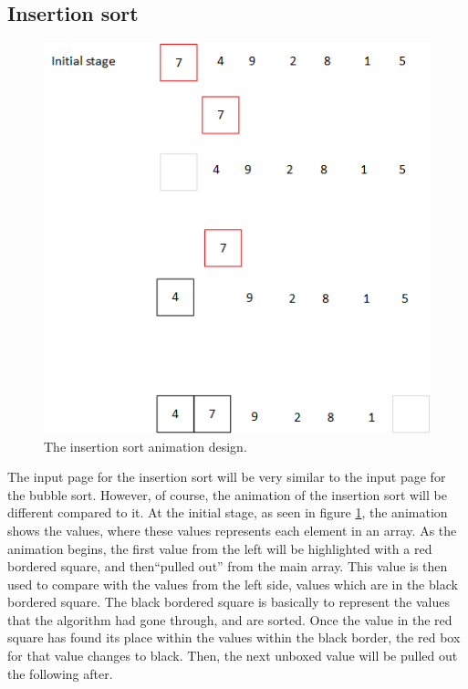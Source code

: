 \newpage

\subsection{Insertion sort}

\begin{figure}[H]
\centering
\includegraphics[scale=0.9]{images/report_images/animationDesignInsertionSort.png}
\caption{The insertion sort animation design.}
\label{animationDesignInsertionSort}
\end{figure}

The input page for the insertion sort will be very similar to the input page for the bubble sort. However, of course, the animation of the insertion sort will be different compared to it. At the initial stage, as seen in figure \ref{animationDesignInsertionSort}, the animation shows the values, where these values represents each element in an array. As the animation begins, the first value from the left will be highlighted with a red bordered square, and then``pulled out'' from the main array. This value is then used to compare with the values from the left side, values which are in the black bordered square. The black bordered square is basically to represent the values that the algorithm had gone through, and are sorted. Once the value in the red square has found its place within the values within the black border, the red box for that value changes to black. Then, the next unboxed value will be pulled out the following after.

